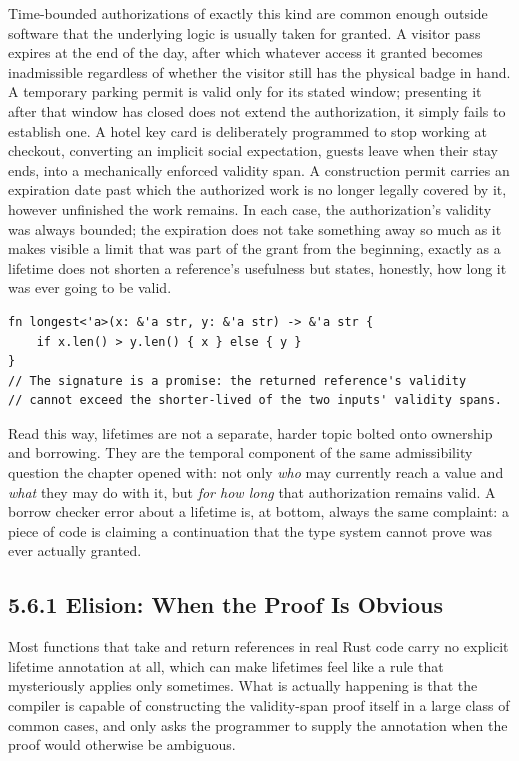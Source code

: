 \documentclass[11pt]{book}
\begin{document}
Time-bounded authorizations of exactly this kind are common enough outside software that the underlying logic is usually taken for granted. A visitor pass expires at the end of the day, after which whatever access it granted becomes inadmissible regardless of whether the visitor still has the physical badge in hand. A temporary parking permit is valid only for its stated window; presenting it after that window has closed does not extend the authorization, it simply fails to establish one. A hotel key card is deliberately programmed to stop working at checkout, converting an implicit social expectation, guests leave when their stay ends, into a mechanically enforced validity span. A construction permit carries an expiration date past which the authorized work is no longer legally covered by it, however unfinished the work remains. In each case, the authorization's validity was always bounded; the expiration does not take something away so much as it makes visible a limit that was part of the grant from the beginning, exactly as a lifetime does not shorten a reference's usefulness but states, honestly, how long it was ever going to be valid.

\begin{lstlisting}
fn longest<'a>(x: &'a str, y: &'a str) -> &'a str {
    if x.len() > y.len() { x } else { y }
}
// The signature is a promise: the returned reference's validity
// cannot exceed the shorter-lived of the two inputs' validity spans.
\end{lstlisting}

Read this way, lifetimes are not a separate, harder topic bolted onto ownership and borrowing. They are the temporal component of the same admissibility question the chapter opened with: not only \emph{who} may currently reach a value and \emph{what} they may do with it, but \emph{for how long} that authorization remains valid. A borrow checker error about a lifetime is, at bottom, always the same complaint: a piece of code is claiming a continuation that the type system cannot prove was ever actually granted.

\subsection*{5.6.1 Elision: When the Proof Is Obvious}

Most functions that take and return references in real Rust code carry no explicit lifetime annotation at all, which can make lifetimes feel like a rule that mysteriously applies only sometimes. What is actually happening is that the compiler is capable of constructing the validity-span proof itself in a large class of common cases, and only asks the programmer to supply the annotation when the proof would otherwise be ambiguous.
\end{document}
